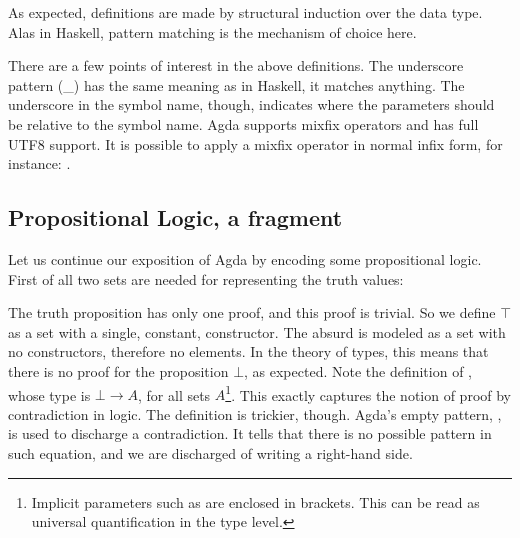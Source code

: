 As expected, definitions are made by structural induction over the
data type. Alas in Haskell, pattern matching is the mechanism of choice here.


There are a few points of interest in the above definitions. The underscore pattern
(\_) has the same meaning as in Haskell, it matches anything. The underscore in
the symbol name, though, indicates where the parameters should be relative to the symbol name. 
Agda supports mixfix operators and has full UTF8 support. It is possible to
apply a mixfix operator in normal infix form, for instance: .

\subsection{Propositional Logic, a fragment}

Let us continue our exposition of Agda by encoding some propositional logic. 
First of all two sets are needed for representing the truth values:


The truth proposition has only one proof, and this proof is trivial. So we define $\top$ as a set
with a single, constant, constructor. The absurd is modeled as a set with no constructors, therefore no elements. In the theory of types,
this means that there is no proof for the proposition $\bot$, as expected. Note the definition
of , whose type is $\bot \rightarrow A$, for all sets $A$\footnote{
Implicit parameters such as  are enclosed in brackets. This can be read as universal quantification in
the type level.
}. This exactly captures
the notion of proof by contradiction in logic. The definition is trickier, though.
Agda's empty pattern, \inlagda{()}, is used to discharge a contradiction. It tells
that there is no possible pattern in such equation, and we are discharged of writing
a right-hand side.



